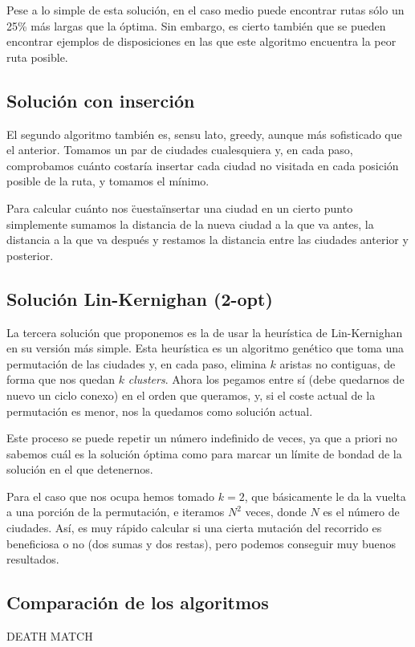 \documentclass[a4paper, 11pt]{article}
\begin{document}
Pese a lo simple de esta solución, en el caso medio puede encontrar rutas sólo un 25\% más largas que la óptima. Sin embargo, es cierto también que se pueden encontrar ejemplos de disposiciones en las que este algoritmo encuentra la peor ruta posible.

\subsection{Solución con inserción}
El segundo algoritmo también es, sensu lato, greedy, aunque más sofisticado que el anterior. Tomamos un par de ciudades cualesquiera y, en cada paso, comprobamos cuánto costaría insertar cada ciudad no visitada en cada posición posible de la ruta, y tomamos el mínimo. 

Para calcular cuánto nos \"cuesta\" insertar una ciudad en un cierto punto simplemente sumamos la distancia de la nueva ciudad a la que va antes, la distancia a la que va después y restamos la distancia entre las ciudades anterior y posterior.

\subsection{Solución Lin-Kernighan (2-opt)}
La tercera solución que proponemos es la de usar la heurística de Lin-Kernighan en su versión más simple. Esta heurística es un algoritmo genético que toma una permutación de las ciudades y, en cada paso, elimina $k$ aristas no contiguas, de forma que nos quedan $k$ \textit{clusters}. Ahora los pegamos entre sí (debe quedarnos de nuevo un ciclo conexo) en el orden que queramos, y, si el coste actual de la permutación es menor, nos la quedamos como solución actual.

Este proceso se puede repetir un número indefinido de veces, ya que a priori no sabemos cuál es la solución óptima como para marcar un límite de bondad de la solución en el que detenernos.

Para el caso que nos ocupa hemos tomado $k=2$, que básicamente le da la vuelta a una porción de la permutación, e iteramos $N^2$ veces, donde $N$ es el número de ciudades. Así, es muy rápido calcular si una cierta mutación del recorrido es beneficiosa o no (dos sumas y dos restas), pero podemos conseguir muy buenos resultados.

\subsection{Comparación de los algoritmos}

DEATH MATCH
\end{document}
